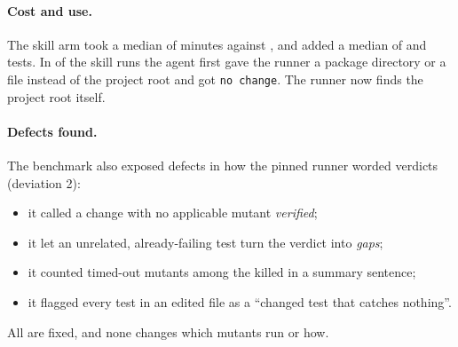 \paragraph{Cost and use.} The skill arm took a median of \VMinutesSkill{} minutes against \VMinutesBase{}, and added a median of \VTestsSkill{} and \VTestsBase{} tests. In \VWrongPath{} of the \VTasks{} skill runs the agent first gave the runner a package directory or a file instead of the project root and got \texttt{no change}. The runner now finds the project root itself.

\paragraph{Defects found.} The benchmark also exposed defects in how the pinned runner worded verdicts (deviation 2):
\begin{itemize}
  \item it called a change with no applicable mutant \emph{verified};
  \item it let an unrelated, already-failing test turn the verdict into \emph{gaps};
  \item it counted timed-out mutants among the killed in a summary sentence;
  \item it flagged every test in an edited file as a ``changed test that catches nothing''.
\end{itemize}
All are fixed, and none changes which mutants run or how.

